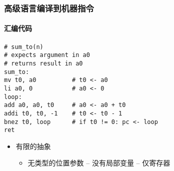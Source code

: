 %	
%	

\begin{frame}
\frametitle{高级语言编译到机器指令}
\framesubtitle{汇编代码}

\small	
\centering
\begin{block}{}
\begin{verbatim}
# sum_to(n)
# expects argument in a0
# returns result in a0
sum_to:
mv t0, a0          # t0 <- a0
li a0, 0           # a0 <- 0
loop:
add a0, a0, t0     # a0 <- a0 + t0
addi t0, t0, -1    # t0 <- t0 - 1
bnez t0, loop      # if t0 != 0: pc <- loop
ret
\end{verbatim}
\end{block}

\begin{itemize}
	
	\item 有限的抽象
	\begin{itemize}
	  \item 无类型的位置参数 -- 没有局部变量 -- 仅寄存器
	\end{itemize}
		
\end{itemize}
	
\end{frame}

